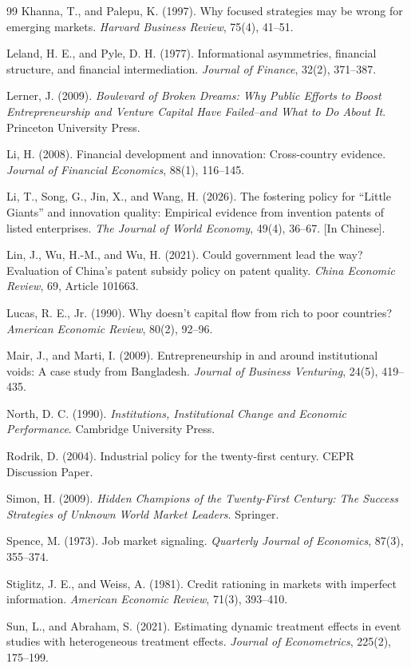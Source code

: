 \documentclass[12pt]{article}
\begin{document}
\begin{thebibliography}{99}
Khanna, T., and Palepu, K. (1997).
Why focused strategies may be wrong for emerging markets.
\textit{Harvard Business Review}, 75(4), 41--51.

Leland, H. E., and Pyle, D. H. (1977).
Informational asymmetries, financial structure, and financial intermediation.
\textit{Journal of Finance}, 32(2), 371--387.

Lerner, J. (2009).
\textit{Boulevard of Broken Dreams: Why Public Efforts to Boost Entrepreneurship and Venture Capital Have Failed--and What to Do About It}.
Princeton University Press.

Li, H. (2008).
Financial development and innovation: Cross-country evidence.
\textit{Journal of Financial Economics}, 88(1), 116--145.

Li, T., Song, G., Jin, X., and Wang, H. (2026).
The fostering policy for ``Little Giants'' and innovation quality: Empirical evidence from invention patents of listed enterprises.
\textit{The Journal of World Economy}, 49(4), 36--67. [In Chinese].

Lin, J., Wu, H.-M., and Wu, H. (2021).
Could government lead the way? Evaluation of China's patent subsidy policy on patent quality.
\textit{China Economic Review}, 69, Article 101663.

Lucas, R. E., Jr. (1990).
Why doesn't capital flow from rich to poor countries?
\textit{American Economic Review}, 80(2), 92--96.

Mair, J., and Marti, I. (2009).
Entrepreneurship in and around institutional voids: A case study from Bangladesh.
\textit{Journal of Business Venturing}, 24(5), 419--435.

North, D. C. (1990).
\textit{Institutions, Institutional Change and Economic Performance}.
Cambridge University Press.

Rodrik, D. (2004).
Industrial policy for the twenty-first century.
CEPR Discussion Paper.

Simon, H. (2009).
\textit{Hidden Champions of the Twenty-First Century: The Success Strategies of Unknown World Market Leaders}.
Springer.

Spence, M. (1973).
Job market signaling.
\textit{Quarterly Journal of Economics}, 87(3), 355--374.

Stiglitz, J. E., and Weiss, A. (1981).
Credit rationing in markets with imperfect information.
\textit{American Economic Review}, 71(3), 393--410.

Sun, L., and Abraham, S. (2021).
Estimating dynamic treatment effects in event studies with heterogeneous treatment effects.
\textit{Journal of Econometrics}, 225(2), 175--199.

\end{thebibliography}
\end{document}
